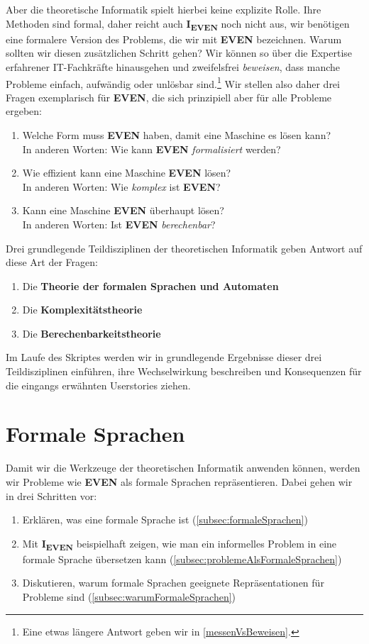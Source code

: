 Aber die theoretische Informatik spielt hierbei keine explizite Rolle.
Ihre Methoden sind formal,
daher reicht auch \textbf{I\textsubscript{EVEN}} noch nicht aus,
wir benötigen eine formalere Version des Problems,
die wir mit \textbf{EVEN} bezeichnen.
Warum sollten wir diesen zusätzlichen Schritt gehen?
Wir können so über die Expertise erfahrener IT-Fachkräfte hinausgehen
und zweifelsfrei \emph{beweisen},
dass manche Probleme einfach, aufwändig oder unlösbar sind.\footnote{
    Eine etwas längere Antwort geben wir in \autoref{messenVsBeweisen}.
}
Wir stellen also daher drei Fragen exemplarisch für \textbf{EVEN},
die sich prinzipiell aber für alle Probleme ergeben:
\begin{enumerate}
    \item Welche Form muss \textbf{EVEN} haben, damit eine Maschine es lösen kann?\\
        In anderen Worten: Wie kann \textbf{EVEN} \emph{formalisiert} werden?
    \item Wie effizient kann eine Maschine \textbf{EVEN} lösen?\\
        In anderen Worten: Wie \emph{komplex} ist \textbf{EVEN}?
    \item Kann eine Maschine \textbf{EVEN} überhaupt lösen?\\
        In anderen Worten: Ist \textbf{EVEN} \emph{berechenbar}?
\end{enumerate}
Drei grundlegende Teildisziplinen der theoretischen Informatik
geben Antwort auf diese Art der Fragen:
\begin{enumerate}
    \item Die \textbf{Theorie der formalen Sprachen und Automaten}
    \item Die \textbf{Komplexitätstheorie}
    \item Die \textbf{Berechenbarkeitstheorie}
\end{enumerate}
Im Laufe des Skriptes werden wir
in grundlegende Ergebnisse dieser drei Teildisziplinen einführen,
ihre Wechselwirkung beschreiben
und Konsequenzen für die eingangs erwähnten Userstories ziehen.

\section{Formale Sprachen}\label{sec:formalisierung}

Damit wir die Werkzeuge der theoretischen Informatik anwenden können,
werden wir Probleme wie \textbf{EVEN} als formale Sprachen repräsentieren.
Dabei gehen wir in drei Schritten vor:
\begin{enumerate}
    \item Erklären, was eine formale Sprache ist (\autoref{subsec:formaleSprachen})
    \item Mit \textbf{I\textsubscript{EVEN}} beispielhaft zeigen,
        wie man ein informelles Problem in eine formale Sprache übersetzen kann
        (\autoref{subsec:problemeAlsFormaleSprachen})
    \item Diskutieren, warum formale Sprachen geeignete Repräsentationen für Probleme sind
        (\autoref{subsec:warumFormaleSprachen})
\end{enumerate}

